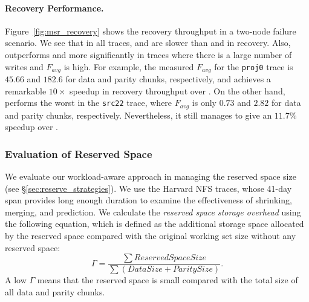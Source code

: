 \paragraph{Recovery Performance.} Figure~\ref{fig:msr_recovery} shows the
recovery throughput in a two-node failure scenario. We see that in all traces,
\FL and \PL are slower than \FO and \PLR in recovery.   Also, \PLR outperforms
\FL and \PL more significantly in traces where there is a large number of
writes and $F_{avg}$ is high.  For example, the measured $F_{avg}$ for the
\texttt{proj0} trace is $45.66$ and $182.6$ for data and parity chunks, 
respectively, and \PLR achieves a remarkable ${10\times}$ speedup in recovery
throughput over \FL.  On the other hand, \PLR performs the worst in the
\texttt{src22} trace, where $F_{avg}$ is only $0.73$ and $2.82$ for data and
parity chunks, respectively.  Nevertheless, it still manages to give an
${11.7}\%$ speedup over \FL.

\subsubsection{Evaluation of Reserved Space}
\label{eval:reserve_evaluation}

We evaluate our workload-aware approach in managing the
reserved space size (see \S\ref{sec:reserve_strategies}). We use the Harvard
NFS traces, whose 41-day span provides long enough duration to examine the
effectiveness of shrinking, merging, and prediction.
We calculate the \textit{reserved space storage overhead} using the following
equation, which is defined as the additional storage space allocated by the
reserved space compared with the original working set size without any reserved
space:
%
\begin{equation*} \label{eq:overhead} \Gamma = \frac{\sum Reserved Space
        Size}{\sum (Data Size + Parity Size)}.
\end{equation*}
%
A low $\Gamma$ means that the reserved space is small
compared with the total size of all data and parity chunks. 

%




